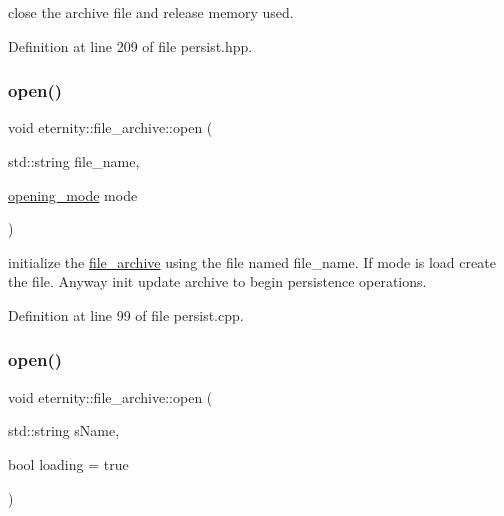 close the archive file and release memory used. 



Definition at line 209 of file persist.\+hpp.

\mbox{\label{classeternity_1_1file__archive_a64a17edf2cea4f1582a5a3c44eb86fa4}} 
\subsubsection{\texorpdfstring{open()}{open()}\hspace{0.1cm}{\footnotesize\ttfamily [1/2]}}
{\footnotesize\ttfamily void eternity\+::file\+\_\+archive\+::open (\begin{DoxyParamCaption}\item[{std\+::string}]{file\+\_\+name,  }\item[{\hyperlink{classeternity_1_1archive_a8881f9ce8dbed2ee600c64b7925afef0}{opening\+\_\+mode}}]{mode }\end{DoxyParamCaption})}

initialize the \hyperlink{classeternity_1_1file__archive}{file\+\_\+archive} using the file named file\+\_\+name. If mode is load create the file. Anyway init update archive to begin persistence operations. 

Definition at line 99 of file persist.\+cpp.

\mbox{\label{classeternity_1_1file__archive_a5f97e0b816c5d9406f675b25f34c21f8}} 
\subsubsection{\texorpdfstring{open()}{open()}\hspace{0.1cm}{\footnotesize\ttfamily [2/2]}}
{\footnotesize\ttfamily void eternity\+::file\+\_\+archive\+::open (\begin{DoxyParamCaption}\item[{std\+::string}]{s\+Name,  }\item[{bool}]{loading = {\ttfamily true} }\end{DoxyParamCaption})}



